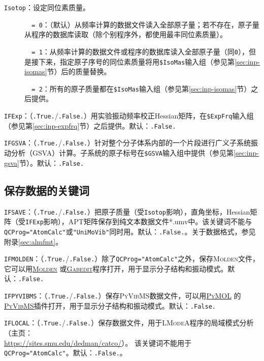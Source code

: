 \documentclass[12pt,a4paper,openany,twoside,cap,UTF8]{ctexbook}
\begin{document}
\bigskip{}\noindent
\verb|Isotop|：设定同位素质量。
\begin{description}
\item[ ]\verb|  = 0|：（默认）从频率计算的数据文件读入全部原子量；若不存在，原子量从程序的数据库读取（除个别程序外，都使用最丰同位素质量）。
\item[ ]\verb|  = 1|：从频率计算的数据文件或程序的数据库读入全部原子量（同\verb|0|），但是接下来，指定原子序号的同位素质量将用\verb|$IsoMas|输入组（参见第\ref{sec:inp-isomas}节）后的质量替换。
\item[ ]\verb|  = 2|：所有的原子质量都在\verb|$IsoMas|输入组（参见第\ref{sec:inp-isomas}节）之后提供。
\end{description}

\bigskip{}\noindent
\verb|IFExp|：（\verb|.True.|/\verb|.False.|）用实验振动频率校正Hessian矩阵，在\verb|$ExpFrq|输入组（参见第\ref{sec:inp-expfrq}节）之后提供。默认：\verb|.False.|

\bigskip{}\noindent
\verb|IFGSVA|：（\verb|.True.|/\verb|.False.|）针对整个分子体系内部的一个片段进行广义子系统振动分析（GSVA）计算。子系统的原子标号在\verb|$GSVA|输入组中提供（参见第\ref{sec:inp-gsva}节）。默认：\verb|.False.|


\subsection{保存数据的关键词} \label{subsec:inp-qcdata-save}

\bigskip{}\noindent
\verb|IFSAVE|：（\verb|.True.|/\verb|.False.|）把原子质量（受\verb|Isotop|影响），直角坐标，Hessian矩阵（受\verb|IFExp|影响），APT矩阵保存到纯文本数据文件*.umv中。该关键词不能与\verb|QCProg="AtomCalc"|或\verb|"UniMoVib"|同时用。默认：\verb|.False.|。关于数据格式，参见附录\ref{sec:almfmt}。

\bigskip{}\noindent
\verb|IFMOLDEN|：（\verb|.True.|/\verb|.False.|）除了\verb|QCProg="AtomCalc"|之外，保存\textsc{Molden}文件，它可以用\href{https://www.theochem.ru.nl/molden/}{\textsc{Molden}} 或\href{http://gabedit.sourceforge.net/}{\textsc{Gabedit}}程序打开，用于显示分子结构和振动模式。默认：\verb|.False.|

\bigskip{}\noindent
\verb|IFPYVIBMS|：（\verb|.True.|/\verb|.False.|）保存\textsc{PyVibMS}数据文件，可以用\href{https://pymol.org/}{\textsc{PyMOL}}
的\href{https://github.com/smutao/PyVibMS}{\textsc{PyVibMS}}插件打开，用于显示分子结构和振动模式。默认：\verb|.False.|

\bigskip{}\noindent
\verb|IFLOCAL|：（\verb|.True.|/\verb|.False.|）保存数据文件，用于\textsc{LModeA}程序的局域模式分析（主页：\\
\href{https://sites.smu.edu/dedman/catco/}{https://sites.smu.edu/dedman/catco/}）。
该关键词不能用于\verb|QCProg="AtomCalc"|。默认：\verb|.False.|。
\end{document}
